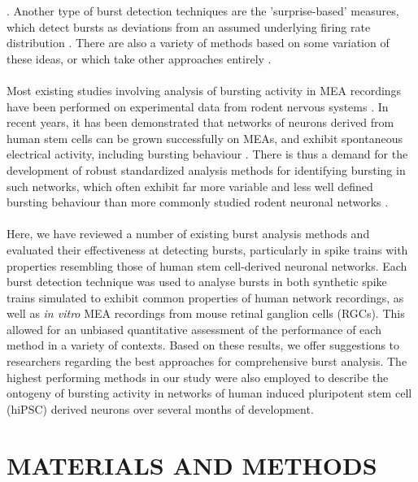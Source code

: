\documentclass[12pt, titlepage]{article}
\begin{document}
	\cite{Cocatre-Zilgien1992,Selinger2007,Pasquale2010,Kaneoke1996,Bakkum2013,Kapucu2012}.
	 Another type of burst detection techniques are the 'surprise-based' measures, which detect bursts as deviations from an assumed underlying firing rate distribution \cite{Legendy1985,Ko2012,Gourevitch2007}. There are also a variety of methods based on some variation of these ideas, or which take other approaches entirely \cite{Hennig2011,Tokdar2010,Turnbull2005,Tam2002,Xia2003,Wagenaar2005,Weihberger2013}.
	\\ \\ Most existing studies involving analysis of bursting activity in MEA recordings have been performed on experimental data from rodent nervous systems \cite{Charlesworth2015,Mazzoni2007}. In recent years, it has been demonstrated that networks of neurons derived from human stem cells can be grown successfully on MEAs, and exhibit spontaneous electrical activity, including bursting behaviour \cite{Illes2007,Heikkila2009}. %
	There is thus a demand for the development of robust standardized analysis methods for identifying bursting in such networks, which often exhibit far more variable and less well defined bursting behaviour than more commonly studied rodent neuronal networks \cite{Kapucu2012}.
	\\ \\ Here, we have reviewed a number of existing burst analysis methods and evaluated their effectiveness at detecting bursts, particularly in spike trains with properties resembling those of human stem cell-derived neuronal networks. Each burst detection technique was used to analyse bursts in both synthetic spike trains simulated to exhibit common properties of human network recordings, as well as \textit{in vitro} MEA recordings from mouse retinal ganglion cells (RGCs). This allowed for an unbiased quantitative assessment of the performance of each method in a variety of contexts. Based on these results, we offer suggestions to researchers regarding the best approaches for comprehensive burst analysis. The highest performing methods in our study were also employed to describe the ontogeny of bursting activity in networks of human induced pluripotent stem cell (hiPSC) derived neurons over several months of development. 
	\section*{MATERIALS AND METHODS}
\end{document}
